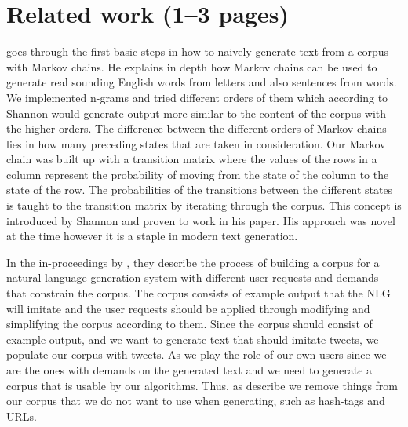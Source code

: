 \documentclass[a4paper,12pt]{article}
\begin{document}
\newpage
\section{Related work (1--3 pages)}
\label{sec:relwork}
%

\cite{shannon48} goes through the first basic steps in how to naively generate text from a corpus with Markov chains. 
He explains in depth how Markov chains can be used to generate real sounding English words from letters and also sentences from words. 
We implemented n-grams and tried different orders of them which according to Shannon would generate output more similar to the content of the corpus with the higher orders. 
The difference between the different orders of Markov chains lies in how many preceding states that are taken in consideration.
Our Markov chain was built up with a transition matrix where the values of the rows in a column represent the probability of moving from the state of the column to the state of the row. The probabilities of the transitions between the different states is taught to the transition matrix by iterating through the corpus. This concept is introduced by Shannon and proven to work in his paper.
His approach was novel at the time however it is a staple in modern text generation. 


In the in-proceedings by \cite{Corpus}, they describe the process of building a corpus for a natural language generation system with different user requests and demands that constrain the corpus. 
The corpus consists of example output that the NLG will imitate and the user requests should be applied through modifying and simplifying the corpus according to them.
Since the corpus should consist of example output, and we want to generate text that should imitate tweets, we populate our corpus with tweets.
As we play the role of our own users since we are the ones with demands on the generated text and we need to generate a corpus that is usable by our algorithms. Thus, as \citep{Corpus} describe we remove things from our corpus that we do not want to use when generating, such as hash-tags and URLs.
\end{document}
